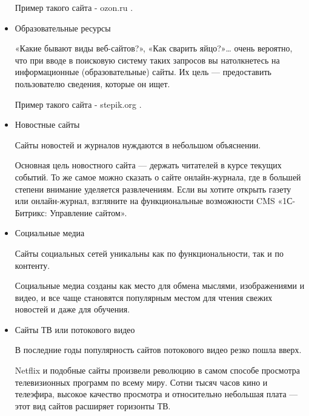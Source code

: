 \begin{itemize}
    Пример такого сайта - ozon.ru \cite{ozon}.

	\item Образовательные ресурсы

	«Какие бывают виды веб-сайтов?», «Как сварить яйцо?»… очень вероятно, что при вводе в поисковую систему таких запросов вы натолкнетесь на информационные (образовательные) сайты. Их цель — предоставить пользователю сведения, которые он ищет.

    Пример такого сайта - stepik.org \cite{stepik}.

	\item Новостные сайты

	Сайты новостей и журналов нуждаются в небольшом объяснении.

	Основная цель новостного сайта — держать читателей в курсе текущих событий. То же самое можно сказать о сайте онлайн-журнала, где в большей степени внимание уделяется развлечениям. Если вы хотите открыть газету или онлайн-журнал, взгляните на функциональные возможности CMS «1С-Битрикс: Управление сайтом».

	\item Социальные медиа

	Сайты социальных сетей уникальны как по функциональности, так и по контенту.

	Социальные медиа созданы как место для обмена мыслями, изображениями и видео, и все чаще становятся популярным местом для чтения свежих новостей и даже для обучения.

	\item Сайты ТВ или потокового видео

	В последние годы популярность сайтов потокового видео резко пошла вверх.

	Netflix и подобные сайты произвели революцию в самом способе просмотра телевизионных программ по всему миру. Сотни тысяч часов кино и телеэфира, высокое качество просмотра и относительно небольшая плата — этот вид сайтов расширяет горизонты ТВ.
\end{itemize}


